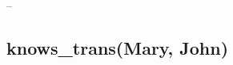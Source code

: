 \documentclass[letterpaper,10pt,english]{sphinxmanual}
\begin{document}
--
\begin{figure}[htbp]
\centering

\end{figure}


\subsection{knows\_trans(Mary, John)}
\label{assign3:knows-trans-mary-john}\begin{figure}[htbp]
\centering

\end{figure}
\end{document}
